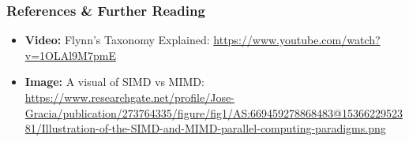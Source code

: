 \subsubsection{References \& Further Reading}
\begin{itemize}
    \item \textbf{Video:} Flynn's Taxonomy Explained: \url{https://www.youtube.com/watch?v=1OLAl9M7pmE}
    \item \textbf{Image:} A visual of SIMD vs MIMD: \url{https://www.researchgate.net/profile/Jose-Gracia/publication/273764335/figure/fig1/AS:669459278868483@1536622952381/Illustration-of-the-SIMD-and-MIMD-parallel-computing-paradigms.png}
\end{itemize}

